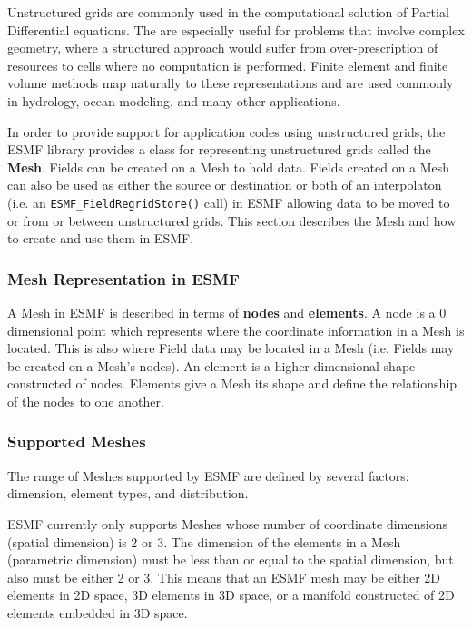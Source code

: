 
Unstructured grids are commonly used in the computational solution of Partial Differential equations.  The are especially useful for problems that involve complex geometry, where a structured approach
would suffer from over-prescription of resources to cells where no computation is performed.  Finite
element and finite volume methods map naturally to these representations and are used commonly
in hydrology, ocean modeling, and many other applications.

In order to provide support for application codes using unstructured grids, the ESMF library provides a class for representing 
unstructured grids called the {\bf Mesh}. Fields can be created on a Mesh to hold data. Fields created on a Mesh can also be used 
as either the source or destination or both of an interpolaton (i.e. an {\tt ESMF\_FieldRegridStore()} call) in ESMF allowing data to be 
moved to or from or between unstructured grids. This section describes the Mesh and how to create and use them in ESMF. 

\subsubsection{Mesh Representation in ESMF}

A Mesh in ESMF is described in terms of {\bf nodes} and {\bf elements}. A node is a 0 dimensional point which represents where the coordinate 
information in a Mesh is located. This is also where Field data may be located in a Mesh (i.e. Fields may be created on a Mesh's nodes). An 
element is a higher dimensional shape constructed of nodes. Elements give a Mesh its shape and define the relationship of the nodes to one 
another. 

\subsubsection{Supported Meshes}

The range of Meshes supported by ESMF are defined by several factors: dimension, element types, and distribution.

ESMF currently only supports Meshes whose number of coordinate dimensions (spatial dimension) is 2 or 3. The dimension of the elements in a Mesh
(parametric dimension) must be less than or equal to the spatial dimension, but also must be either 2 or 3. This means that an ESMF mesh may be
either 2D elements in 2D space, 3D elements in 3D space, or a manifold constructed of 2D elements embedded in 3D space. 

